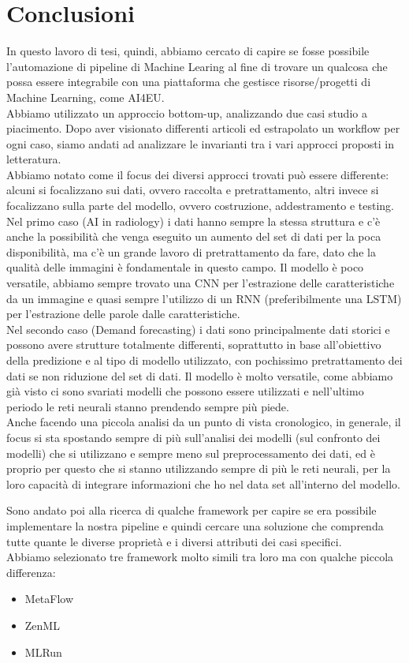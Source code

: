 \documentclass[12pt,a4paper]{report}
\begin{document}
\chapter{Conclusioni}
In questo lavoro di tesi, quindi, abbiamo cercato di capire se fosse possibile l'automazione di pipeline di Machine Learing al fine di trovare un qualcosa che possa essere integrabile con una piattaforma che gestisce risorse/progetti di Machine Learning, come AI4EU.\\
Abbiamo utilizzato un approccio bottom-up, analizzando due casi studio a piacimento. Dopo aver visionato differenti articoli ed estrapolato un workflow per ogni caso, siamo andati ad analizzare le invarianti tra i vari approcci proposti in letteratura.\\
Abbiamo notato come il focus dei diversi approcci trovati può essere differente: alcuni si focalizzano sui dati, ovvero raccolta e pretrattamento, altri invece si focalizzano sulla parte del modello, ovvero costruzione, addestramento e testing.\\
Nel primo caso (AI in radiology) i dati hanno sempre la stessa struttura e c'è anche la possibilità che venga eseguito un aumento del set di dati per la poca disponibilità, ma c'è un grande lavoro di pretrattamento da fare, dato che la qualità delle immagini è fondamentale in questo campo. Il modello è poco versatile, abbiamo sempre trovato una CNN per l'estrazione delle caratteristiche da un immagine e quasi sempre l'utilizzo di un RNN (preferibilmente una LSTM) per l'estrazione delle parole dalle caratteristiche.\\
Nel secondo caso (Demand forecasting) i dati sono principalmente dati storici e possono avere strutture totalmente differenti, soprattutto in base all'obiettivo della predizione e al tipo di modello utilizzato, con pochissimo pretrattamento dei dati se non riduzione del set di dati. Il modello è molto versatile, come abbiamo già visto ci sono svariati modelli che possono essere utilizzati e nell'ultimo periodo le reti neurali stanno prendendo sempre più piede.\\
Anche facendo una piccola analisi da un punto di vista cronologico, in generale, il focus si sta spostando sempre di più sull'analisi dei modelli (sul confronto dei modelli) che si utilizzano e sempre meno sul preprocessamento dei dati, ed è proprio per questo che si stanno utilizzando sempre di più le reti neurali, per la loro capacità di integrare informazioni che ho nel data set all'interno del modello.

Sono andato poi alla ricerca di qualche framework per capire se era possibile implementare la nostra pipeline e quindi cercare una soluzione che comprenda tutte quante le diverse proprietà e i diversi attributi dei casi specifici.\\
Abbiamo selezionato tre framework molto simili tra loro ma con qualche piccola differenza:
\begin{itemize}
    \item MetaFlow
    \item ZenML
    \item MLRun
\end{itemize}
\end{document}
